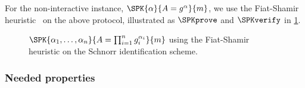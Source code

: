
For the non-interactive instance, \(\SPK{\alpha}{A = g^\alpha}{m}\), we use the 
Fiat-Shamir heuristic~\cite{FiatShamirHeuristic} on the above protocol, 
illustrated as \(\SPKprove\) and \(\SPKverify\) in \cref{SPKalgorithms}.

\begin{figure*}
  \begin{minipage}[t]{0.49\linewidth}
    \begin{algorithmic}
        \EndFor{}
      \EndFunction{}
    \end{algorithmic}
  \end{minipage}
  \hfill
  \begin{minipage}[t]{0.49\linewidth}
    \begin{algorithmic}
        \Else{}
        \EndIf{}
      \EndFunction{}
    \end{algorithmic}
  \end{minipage}
  \caption{%
    \(\SPK{\alpha_1, \dotsc, \alpha_n}{A = \prod_{i=1}^n g_i^{\alpha_i}}{m}\) 
    using the Fiat-Shamir heuristic on the Schnorr identification scheme.
  }%
  \label{SPKalgorithms}
\end{figure*}


\subsubsection{Needed properties}


